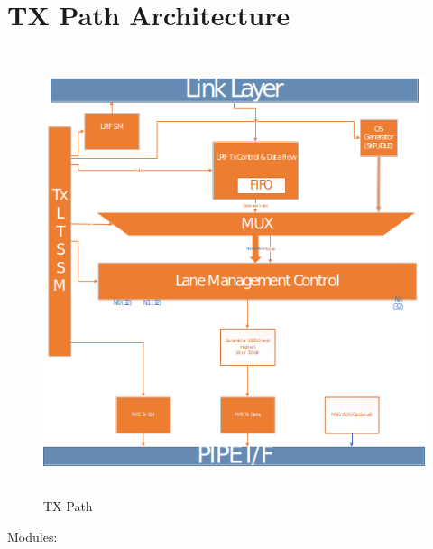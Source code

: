 \section{TX Path Architecture}    
\begin{figure}[H]
  \centering
  \includegraphics[width=130mm,height=130mm]{images/TX.png}
  \caption{TX Path}
    \label{fig:arch}
  \end{figure}
  Modules:
